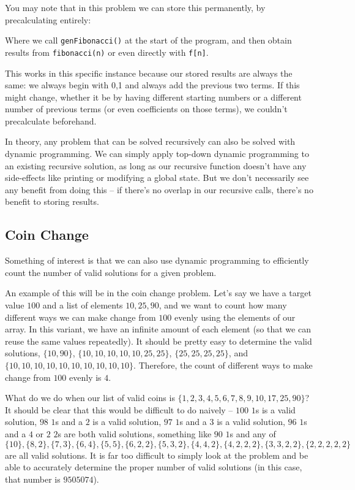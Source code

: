You may note that in this problem we can store this permanently, by precalculating entirely:


Where we call \texttt{genFibonacci()} at the start of the program, and then obtain results from \texttt{fibonacci(n)} or even directly with \texttt{f[n]}.

This works in this specific instance because our stored results are always the same: we always begin with {0,1} and always add the previous two terms. If this might change, whether it be by having different starting numbers or a different number of previous terms (or even coefficients on those terms), we couldn't precalculate beforehand.

In theory, any problem that can be solved recursively can also be solved with dynamic programming. We can simply apply top-down dynamic programming to an existing recursive solution, as long as our recursive function doesn't have any side-effects like printing or modifying a global state. But we don't necessarily see any benefit from doing this -- if there's no overlap in our recursive calls, there's no benefit to storing results.

\subsection{Coin Change}

Something of interest is that we can also use dynamic programming to efficiently count the number of valid solutions for a given problem.

An example of this will be in the coin change problem. Let's say we have a target value $100$ and a list of elements $10,25,90$, and we want to count how many different ways we can make change from $100$ evenly using the elements of our array. In this variant, we have an infinite amount of each element (so that we can reuse the same values repeatedly). It should be pretty easy to determine the valid solutions, $\{10,90\}$, $\{10,10,10,10,10,25,25\}$, $\{25,25,25,25\}$, and $\{10,10,10,10,10,10,10,10,10,10\}$. Therefore, the count of different ways to make change from $100$ evenly is $4$.

What do we do when our list of valid coins is $\{1,2,3,4,5,6,7,8,9,10,17,25,90\}$? It should be clear that this would be difficult to do naively -- $100$ $1$s is a valid solution, $98$ $1$s and a $2$ is a valid solution, $97$ $1$s and a $3$ is a valid solution, $96$ $1$s and a $4$ or $2$ $2$s are both valid solutions, something like $90$ $1$s and any of $\{10\},\allowbreak\{8,2\},\allowbreak\{7,3\},\allowbreak\{6,4\},\allowbreak\{5,5\},\allowbreak\{6,2,2\},\allowbreak\{5,3,2\},\allowbreak\{4,4,2\},\allowbreak\{4,2,2,2\},\allowbreak\{3,3,2,2\},\allowbreak\{2,2,2,2,2\}$ are all valid solutions. It is far too difficult to simply look at the problem and be able to accurately determine the proper number of valid solutions (in this case, that number is $9505074$).

